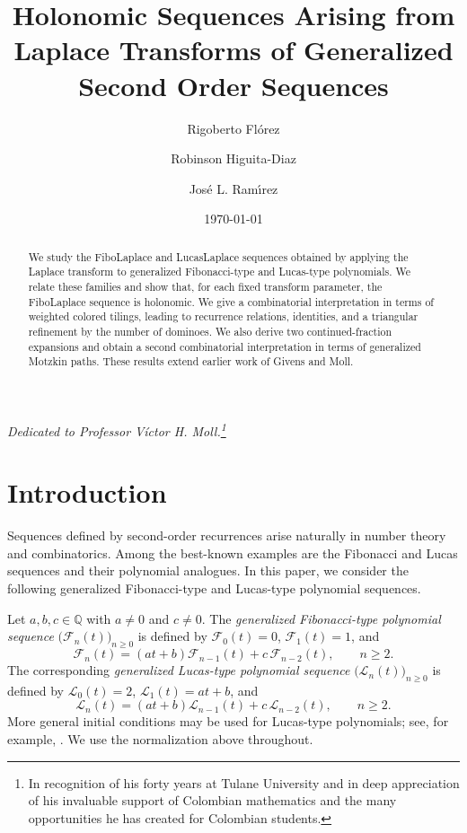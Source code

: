 \documentclass[11pt]{amsart}
\title[Holonomic Sequences from Laplace Transforms of  Second Order Sequences]{Holonomic Sequences Arising from Laplace Transforms of Generalized Second Order Sequences}
\date{\today}
\author[R. Fl\'orez]{Rigoberto Fl\'orez \orcidlink{0000-0002-3644-9358}}
\author[R.  Higuita-Diaz]{Robinson Higuita-Diaz \orcidlink{0000-0003-3305-0381}}
\author[J. L. Ram\'{\i}rez]{Jos\'e L. Ram\'{\i}rez \orcidlink{0000-0002-8028-9312}}
\newcommand{\Ft}[1]{\mathscr{F}_{#1}}
\newcommand{\Lt}[1]{\mathscr{L}_{#1}}
\theoremstyle{plain}
\numberwithin{equation}{section}
\begin{document}
\begin{abstract}
We study the FiboLaplace and LucasLaplace sequences obtained by applying
the Laplace transform to generalized Fibonacci-type and Lucas-type
polynomials. We relate these families and show that, for each fixed
transform parameter, the FiboLaplace sequence is holonomic. We give a
combinatorial interpretation in terms of weighted colored tilings,
leading to recurrence relations, identities, and a triangular
refinement by the number of dominoes. We also derive two continued-fraction expansions and  obtain a second combinatorial interpretation in terms of 
generalized Motzkin paths. These results extend earlier work of Givens and Moll.
\end{abstract}

\maketitle
\begin{center}
\emph{Dedicated to Professor Víctor H. Moll.\footnote{In recognition of
his forty years at Tulane University and in deep appreciation of his
invaluable support of Colombian mathematics and the many opportunities
he has created for Colombian students.}}
\end{center}

\section{Introduction}

Sequences defined by second-order recurrences arise naturally in number theory and combinatorics. Among the best-known examples are the Fibonacci and Lucas sequences and their polynomial analogues. In this paper, we consider the following generalized Fibonacci-type and Lucas-type polynomial sequences.

Let $a,b,c\in\mathbb{Q}$ with $a\neq 0$ and $c\neq 0$. The \emph{generalized Fibonacci-type polynomial sequence}
$\bigl(\Ft{n}(t)\bigr)_{n\geq 0}$ is defined by $\Ft{0}(t)=0$, $\Ft{1}(t)=1$, and
\begin{equation}\label{Fibonacci;general:FT}
\Ft{n}(t)=(at+b)\Ft{n-1}(t)+c\,\Ft{n-2}(t), \qquad n\geq 2.
\end{equation}
The corresponding \emph{generalized Lucas-type polynomial sequence}
$\bigl(\Lt{n}(t)\bigr)_{n\geq 0}$ is defined by
$\Lt{0}(t)=2$, $\Lt{1}(t)=at+b$, and
\begin{equation}\label{Fibonacci;general:LT}
\Lt{n}(t)
=
(at+b)\Lt{n-1}(t)+c\,\Lt{n-2}(t),
\qquad n\geq 2.
\end{equation}
More general initial conditions may be used for Lucas-type polynomials; see, for example,
\cite{florezHiguitaMuk2018}. We use the normalization above throughout.
\end{document}
